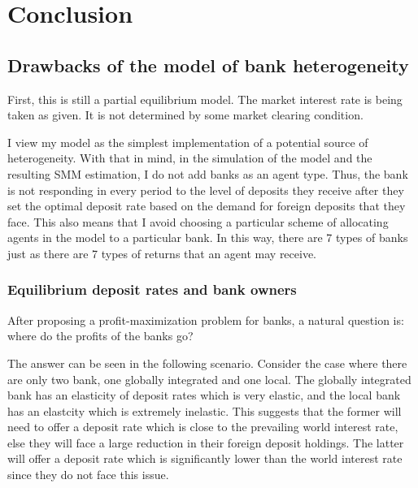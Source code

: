 \onlyinsubfile{\setcounter{section}{5}}
\section{Conclusion}
\notinsubfile{\label{sec:Conclusion}}

\par

\subsection{Drawbacks of the model of bank heterogeneity}

\par First, this is still a partial equilibrium model. The market interest rate is being taken as given. It is not determined by some market clearing condition.

\par I view my model as the simplest implementation of a potential source of heterogeneity. With that in mind, in the simulation of the model and the resulting SMM estimation, I do not add banks as an agent type. Thus, the bank is not responding in every period to the level of deposits they receive after they set the optimal deposit rate based on the demand for foreign deposits that they face. This also means that I avoid choosing a particular scheme of allocating agents in the model to a particular bank. In this way, there are 7 types of banks just as there are 7 types of returns that an agent may receive. 

\subsubsection{Equilibrium deposit rates and bank owners}

\par After proposing a profit-maximization problem for banks, a natural question is: where do the profits of the banks go? 

\par The answer can be seen in the following scenario. Consider the case where there are only two bank, one globally integrated and one local. The globally integrated bank has an elasticity of deposit rates which is very elastic, and the local bank has an elastcity which is extremely inelastic. This suggests that the former will need to offer a deposit rate which is close to the prevailing world interest rate, else they will face a large reduction in their foreign deposit holdings. The latter will offer a deposit rate which is significantly lower than the world interest rate since they do not face this issue.

